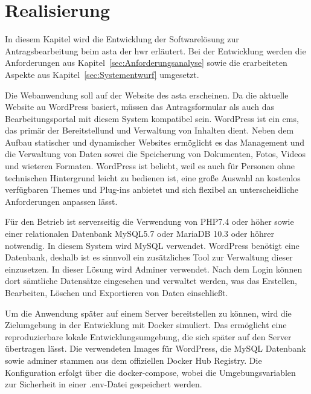 
\chapter{Realisierung}\label{cha:Realisierung}
In diesem Kapitel wird die Entwicklung der Softwarelösung zur Antragsbearbeitung beim \gls{asta} der \gls{hwr} erläutert. Bei der Entwicklung werden die Anforderungen aus Kapitel~\ref{sec:Anforderungsanalyse} sowie die erarbeiteten Aspekte aus Kapitel~\ref{sec:Systementwurf} umgesetzt. 

Die Webanwendung soll auf der Website des \gls{asta} erscheinen. Da die aktuelle Website au WordPress basiert, müssen das Antragsformular als auch das Bearbeitungsportal mit diesem System kompatibel sein. WordPress ist ein \gls{cms}, das primär der Bereitstellund und Verwaltung von Inhalten dient. Neben dem Aufbau statischer und dynamischer Websites ermöglicht es das Management und die Verwaltung von Daten sowei die Speicherung von Dokumenten, Fotos, Videos und wieteren Formaten. WordPress ist beliebt, weil es auch für Personen ohne technischen Hintergrund leicht zu bedienen ist, eine große Auswahl an kostenlos verfügbaren Themes und Plug-ins anbietet und sich flexibel an unterscheidliche Anforderungen anpassen lässt. 

Für den Betrieb ist serverseitig die Verwendung von PHP7.4 oder höher sowie einer relationalen Datenbank MySQL5.7 oder MariaDB 10.3 oder höhrer notwendig. In diesem System wird MySQL verwendet. WordPress benötigt eine Datenbank, deshalb ist es sinnvoll ein zusätzliches Tool zur Verwaltung dieser einzusetzen. In dieser Lösung wird Adminer verwendet. Nach dem Login können dort sämtliche Datensätze eingesehen und verwaltet werden, was das Erstellen, Bearbeiten, Löschen und Exportieren von Daten einschließt. 

Um die Anwendung später auf einem Server bereitstellen zu können, wird die Zielumgebung in der Entwicklung mit Docker simuliert. Das ermöglicht eine reproduzierbare lokale Entwicklungsumgebung, die sich später auf den Server übertragen lässt. Die verwendeten Images für WordPress, die MySQL Datenbank sowie adminer stammen aus dem offiziellen Docker Hub Registry. Die Konfiguration erfolgt über die docker-compose, wobei die Umgebungsvariablen zur Sicherheit in einer .env-Datei gespeichert werden. 

